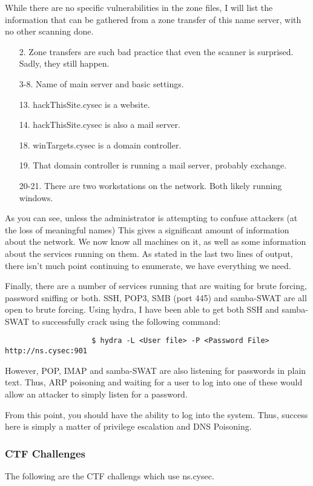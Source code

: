 				While there are no specific vulnerabilities in the zone files, I will list the information that can be gathered from a zone transfer of this name server, with no other scanning done.
				
				\begin{enumerate}
					\item[2.] Zone transfers are such bad practice that even the scanner is surprised. Sadly, they still happen.
					\item[3-8.] Name of main server and basic settings.
					\item[13.] hackThisSite.cysec is a website.
					\item[14.] hackThisSite.cysec is also a mail server.
					\item[18.] winTargets.cysec is a domain controller.
					\item[19.] That domain controller is running a mail server, probably exchange.
					\item[20-21.] There are two workstations on the network. Both likely running windows.
				\end{enumerate}
				As you can see, unless the administrator is attempting to confuse attackers (at the loss of meaningful names)
				This gives a significant amount of information about the network.
				We now know all machines on it, as well as some information about the services running on them.
				As stated in the last two lines of output, there isn't much point continuing to enumerate, we have everything we need.

				Finally, there are a number of services running that are waiting for brute forcing, password sniffing or both.
				SSH, POP3, SMB (port 445) and samba-SWAT are all open to brute forcing.
				Using hydra, I have been able to get both SSH and samba-SWAT to successfully crack using the following command:
				\begin{verbatim}
					$ hydra -L <User file> -P <Password File> http://ns.cysec:901
				\end{verbatim}

				However, POP, IMAP and samba-SWAT are also listening for passwords in plain text.
				Thus, ARP poisoning and waiting for a user to log into one of these would allow an attacker to simply listen for a password.

				From this point, you should have the ability to log into the system.
				Thus, success here is simply a matter of privilege escalation and DNS Poisoning.
			\subsubsection{CTF Challenges}
				The following are the CTF challengs which use ns.cysec.
